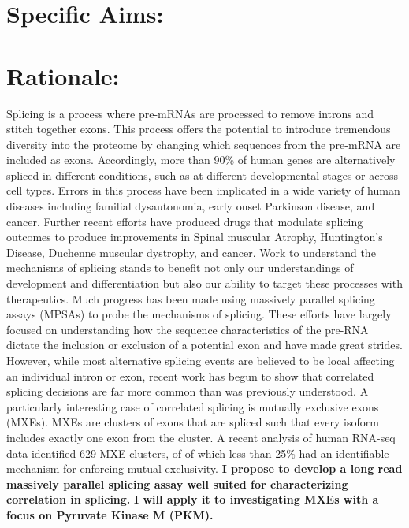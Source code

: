 \documentclass{article}
\begin{document}
\section*{Specific Aims:}
%
\section*{Rationale: } 
Splicing is a process where pre-mRNAs are processed to remove introns and stitch together exons. 
This process offers the potential to introduce tremendous diversity into the proteome by changing which sequences from the pre-mRNA are included as exons.
Accordingly, more than 90\% of human genes are alternatively spliced in different conditions, such as at different developmental stages or across cell types.\cite{Wang2008-ej} 
Errors in this process have been implicated in a wide variety of human diseases including familial dysautonomia, early onset Parkinson disease, and cancer.\cite{Scotti2015-yp} 
Further recent efforts have produced drugs that modulate splicing outcomes to produce improvements in Spinal muscular Atrophy, Huntington's Disease, Duchenne muscular dystrophy, and cancer.\cite{Neil2022-vf}
Work to understand the mechanisms of splicing stands to benefit not only our understandings of development and differentiation but also our ability to target these processes with therapeutics.
Much progress has been made using massively parallel splicing assays (MPSAs) to probe the mechanisms of splicing.\cite{Ke2018-af, Julien2016-wa, Adamson2018-va, Soemedi2017-pz, Cortes-Lopez2022-gy, Schirman2021-ss, Mikl2019-ng, Braun2018-mb, Soucek2019-iq, Baeza-Centurion2020-tn, Cheung2019-ah, Baeza-Centurion2019-hz, Rosenberg2015-zs, Wong2018-vq} 
These efforts have largely focused on understanding how the sequence characteristics of the pre-RNA dictate the inclusion or exclusion of a potential exon and have made great strides.
However, while most alternative splicing events are believed to be local affecting an individual intron or exon, recent work has begun to show that correlated splicing decisions are far more common than was previously understood.\cite{Zhu2021-fs, Tilgner2015-sb, Hatje2017-oj} 
A particularly interesting case of correlated splicing is mutually exclusive exons (MXEs). 
MXEs are clusters of exons that are spliced such that every isoform includes exactly one exon from the cluster. 
A recent analysis of human RNA-seq data identified 629 MXE clusters, of of which less than 25\% had an identifiable mechanism for enforcing mutual exclusivity.\cite{Hatje2017-oj} 
\textbf{I propose to develop a long read massively parallel splicing assay well suited for characterizing correlation in splicing.} 
\textbf{I will apply it to investigating MXEs with a focus on Pyruvate Kinase M (PKM).} 
\\
\end{document}
